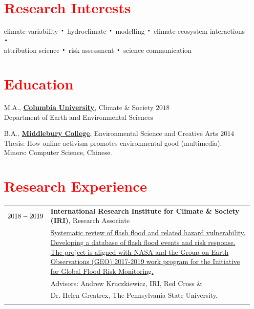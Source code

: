 \documentclass[margin, line]{res}
\newcommand*{\bigDot}{\raisebox{-0.25ex}{\scalebox{2.1}{$\cdot$}}}
\newcommand{\CU}{http://climatesociety.ei.columbia.edu/}
\newcommand{\Midd}{http://www.middlebury.edu/academics/es}
\begin{document}
 



\begin{resume}



\section{\sc \textcolor{Red}{\large{Research Interests}}}
climate variability $\bigDot$  hydroclimate $\bigDot$  modelling $\bigDot$  climate-ecosystem interactions $\bigDot$  \\attribution science $\bigDot$ risk assessment $\bigDot$ science communication  

\vspace{0.15in}
\section{\sc \textcolor{Red}{\large{Education}}}

M.A., {\bf \href{\CU}{Columbia University}}, Climate \& Society   \hfill {$2018$}
\\
Department of Earth and Environmental Sciences
\\
    \vspace*{-.15in} 
  
B.A., {\bf \href{\Midd}{Middlebury College}}, Environmental Science and Creative Arts 
\hfill {$2014$}
\\
    Thesis:  How online activism promotes environmental good (multimedia).   \\ 
    Minors: Computer Science, Chinese. 
 

\section{\sc \textcolor{Red}{\large{Research Experience}}}
\vspace*{0.05in}
\begin{tabular}{@{}p{1 in}p{4in}}
$\text 2018 - 2019$& \textbf{International Research Institute for Climate \& Society (IRI)},  Research Associate \\
& \href{GEO}{Systematic review of flash flood and related hazard vulnerability.  Developing a database of flash flood events and risk response. The project is aligned with NASA and the Group on Earth Observations (GEO) 2017-2019 work program for the Initiative for Global Flood Risk Monitoring.} \\
& \hspace{0.3in} Advisors: Andrew Kruczkiewicz, IRI, Red Cross \& \\
& \hspace{0.3in} Dr. Helen Greatrex, The Pennsylvania State University. \\ \\


\end{tabular}
\end{resume}
\end{document}
